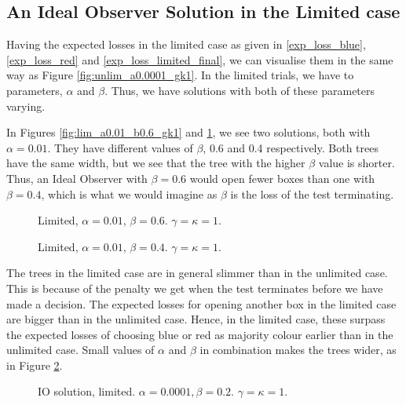 \subsection{An Ideal Observer Solution in the Limited case}
Having the expected losses in the limited case as given in \eqref{exp_loss_blue}, \eqref{exp_loss_red} and \eqref{exp_loss_limited_final}, we can visualise them in the same way as Figure \ref{fig:unlim_a0.0001_gk1}. In the limited trials, we have to parameters, $\alpha$ and $\beta$. Thus, we have solutions with both of these parameters varying. 

In Figures \ref{fig:lim_a0.01_b0.6_gk1} and \ref{fig:lim_a0.01_b0.4_gk1}, we see two solutions, both with $\alpha=0.01$. They have different values of $\beta$, 0.6 and 0.4 respectively. Both trees have the same width, but we see that the tree with the higher $\beta$ value is shorter. Thus, an Ideal Observer with $\beta=0.6$ would open fewer boxes than one with $\beta=0.4$, which is what we would imagine as $\beta$ is the loss of the test terminating. 
\begin{figure}
    \centering
    \begin{minipage}[t]{0.45\textwidth}
        \centering
        \scalebox{0.8}{}
        \caption[Limited something]{Limited, $\alpha=0.01$, $\beta=0.6$. $\gamma=\kappa=1$.}
        \label{fig:lim_a0.01_b0.6_gk1}
    \end{minipage}\hfill
    \begin{minipage}[t]{0.45\textwidth}
        \centering
        \scalebox{0.8}{}
        \caption[Limited something]{Limited, $\alpha=0.01$, $\beta=0.4$. $\gamma=\kappa=1$.}
        \label{fig:lim_a0.01_b0.4_gk1}
    \end{minipage}
\end{figure}


The trees in the limited case are in general slimmer than in the unlimited case. This is because of the penalty we get when the test terminates before we have made a decision. The expected losses for opening another box in the limited case are bigger than in the unlimited case. Hence, in the limited case, these surpass the expected losses of choosing blue or red as majority colour earlier than in the unlimited case. Small values of $\alpha$ and $\beta$ in combination makes the trees wider, as in Figure \ref{fig:lim_a0.0001_b0.2_gk1}.
\begin{figure}
    \centering
    \scalebox{0.8}{}
    \caption[IO solution, limited. $\alpha=0.0001, \beta=0.2$. $\gamma=\kappa=1$.]{IO solution, limited. $\alpha=0.0001, \beta=0.2$. $\gamma=\kappa=1$.}
    \label{fig:lim_a0.0001_b0.2_gk1}
\end{figure}

